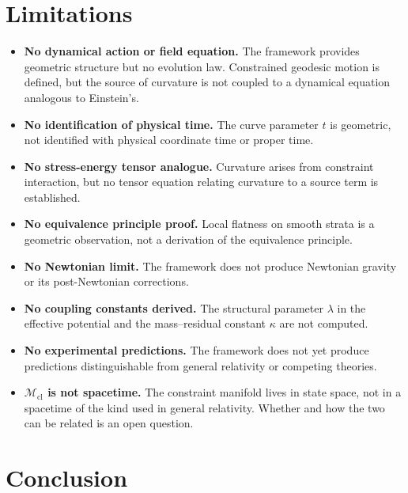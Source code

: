 \documentclass[12pt]{article}
\newcommand{\Mcl}{\mathcal{M}_{\mathrm{cl}}}
\begin{document}
\section{Limitations}\label{sec:limits}

\begin{itemize}
    \item \textbf{No dynamical action or field equation.} The framework provides geometric structure but no evolution law. Constrained geodesic motion is defined, but the source of curvature is not coupled to a dynamical equation analogous to Einstein's.
    \item \textbf{No identification of physical time.} The curve parameter $t$ is geometric, not identified with physical coordinate time or proper time.
    \item \textbf{No stress-energy tensor analogue.} Curvature arises from constraint interaction, but no tensor equation relating curvature to a source term is established.
    \item \textbf{No equivalence principle proof.} Local flatness on smooth strata is a geometric observation, not a derivation of the equivalence principle.
    \item \textbf{No Newtonian limit.} The framework does not produce Newtonian gravity or its post-Newtonian corrections.
    \item \textbf{No coupling constants derived.} The structural parameter $\lambda$ in the effective potential and the mass--residual constant $\kappa$ are not computed.
    \item \textbf{No experimental predictions.} The framework does not yet produce predictions distinguishable from general relativity or competing theories.
    \item \textbf{$\Mcl$ is not spacetime.} The constraint manifold lives in state space, not in a spacetime of the kind used in general relativity. Whether and how the two can be related is an open question.
\end{itemize}

\section{Conclusion}\label{sec:conclusion}
\end{document}
